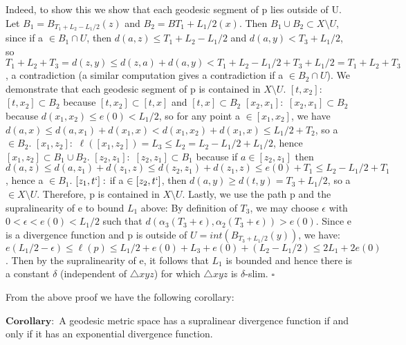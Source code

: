 \documentclass[11pt]{article}
\newcommand{\vs}{\vskip10pt}
\begin{document}
 	 Indeed, to show this we show that each geodesic segment of p lies outside of U. Let $B_1 = B_{
 	 T_1 + L_2 - L_1/2}(z)$ and $B_2 = B{T_1 + L_1/2}(x)$. Then $B_1 \cup B_2 \subset X \setminus U$, since if a $\in B_1 \cap U$, then $d(a, z) \leq T_1 + L_2 - L_1/2$ and $d(a, y) < T_3 + L_1/2$, so $T_1 + L_2 + T_3 = d(z, y) \leq d(z, a) + d(a,y) < T_1 + L_2 - L_1/2 + T_3 + L_1/2 = T_1 + L_2 + T_3$, a contradiction (a similar computation gives a contradiction if a $\in B_2 \cap U$). We demonstrate that each geodesic segment of p is contained in $X \setminus U$. 
  \vs
  	$[t, x_2]: $ $[t, x_2] \subset B_2$ because $[t, x_2] \subset [t,x]$ and $[t,x] \subset B_2$
  	\vskip5pt
  	$[x_2, x_1]: $ $[x_2, x_1] \subset B_2 $ because $d(x_1, x_2) \leq e(0) < L_1/2$, so for any point a $\in [x_1, x_2]$, we have $d(a, x) \leq d(a, x_1) + d(x_1, x) < d(x_1, x_2) + d(x_1, x) \leq L_1/2 + T_2$, so a $\in B_2$.
  	\vskip5pt
  	 $[x_1, z_2]: $ $\ell ([x_1, z_2]) = L_3 \leq L_2 = L_2 - L_1/2 + L_1/2$, hence $[x_1, z_2] \subset B_1 \cup B_2$. 
  	 \vskip5pt
  	 $[z_2, z_1]: $ $[z_2, z_1] \subset B_1$ because if $a \in [z_2, z_1]$ then $d(a, z) \leq d(a, z_1) + d(z_1, z) \leq d(z_2, z_1) + d(z_1, z) \leq e(0) + T_1 \leq L_2 - L_1/2 + T_1$, hence a $\in B_1$.
  	 \vskip5pt
  	 $[z_1, t`]: $ if a $\in [z_2, t`]$, then $d(a, y) \geq d(t, y) = T_3 + L_1/2$, so a $\in X \setminus U$.
  	 \vskip5pt
  	 Therefore, p is contained in $X \setminus U$. 
  	 \vs
  	 Lastly, we use the path p and the supralinearity of e to bound $L_1$ above: 
  	 \vs
  	 By definition of $T_3$, we may choose $\epsilon$ with $0 < \epsilon < e(0) < L_1/2$ such that $d(\alpha_3(T_3 + \epsilon), \alpha_2(T_3 + \epsilon)) > e(0)$. Since e is a divergence function and p is outside of $U = int(B_{T_3 + L_1/2}(y))$, we have: 
  	 \vs
  	 $e(L_1/2 - \epsilon) \leq \ell(p) \leq L_1/2 + e(0) + L_3 + e(0) + (L_2 - L_1/2) \leq 2L_1 + 2e(0)$. 
  	 \vs
  	 Then by the supralinearity of e, it follows that $L_1$ is bounded and hence there is a constant $\delta$ (independent of $\triangle xyz$) for which $\triangle xyz$ is $\delta$-slim. 
  	 $\square$
 	 
 	 \vs
 	 
 	 From the above proof we have the following corollary:
 	 \vs
 	 
 	 $\mathbf{Corollary: }$ A geodesic metric space has a supralinear divergence function if and only if it has an exponential divergence function. 
	
	
\end{document}
